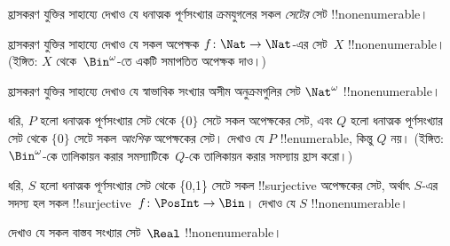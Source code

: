 \documentclass[../../../include/open-logic-section]{subfiles}
\begin{document}
\begin{prob}
হ্রাসকরণ যুক্তির সাহায্যে দেখাও যে ধনাত্মক পূর্ণসংখ্যার ক্রমযুগলের সকল \emph{সেটের} সেট !!{nonenumerable}।
\end{prob}

\begin{prob}\label{sfr:siz:red:prob:nat-nat}
  হ্রাসকরণ যুক্তির সাহায্যে দেখাও যে সকল অপেক্ষক $f\colon \Nat \to \Nat$-এর সেট~$X$ !!{nonenumerable}। (ইঙ্গিত: $X$ থেকে~$\Bin^\omega$-তে একটি সমাপতিত অপেক্ষক দাও।)
\end{prob}

\begin{prob}
হ্রাসকরণ যুক্তির সাহায্যে দেখাও যে স্বাভাবিক সংখ্যার অসীম অনুক্রমগুলির সেট $\Nat^\omega$ !!{nonenumerable}।
\end{prob}

\begin{prob}
ধরি, $P$ হলো ধনাত্মক পূর্ণসংখ্যার সেট থেকে $\{0\}$ সেটে সকল অপেক্ষকের সেট, এবং $Q$ হলো ধনাত্মক পূর্ণসংখ্যার সেট থেকে $\{0\}$ সেটে সকল \emph{আংশিক} অপেক্ষকের সেট। দেখাও যে $P$ !!{enumerable}, কিন্তু $Q$ নয়। (ইঙ্গিত: $\Bin^\omega$-কে তালিকায়ন করার সমস্যাটিকে~$Q$-কে তালিকায়ন করার সমস্যায় হ্রাস করো।)
\end{prob}

\begin{prob}
ধরি, $S$ হলো ধনাত্মক পূর্ণসংখ্যার সেট থেকে \{0,1\} সেটে সকল !!{surjective} অপেক্ষকের সেট, অর্থাৎ $S$-এর সদস্য হল সকল !!{surjective}~$f\colon \PosInt \to \Bin$। দেখাও যে $S$ !!{nonenumerable}।
\end{prob}

\begin{prob}
দেখাও যে সকল বাস্তব সংখ্যার সেট~$\Real$ !!{nonenumerable}।
\end{prob}
\end{document}
